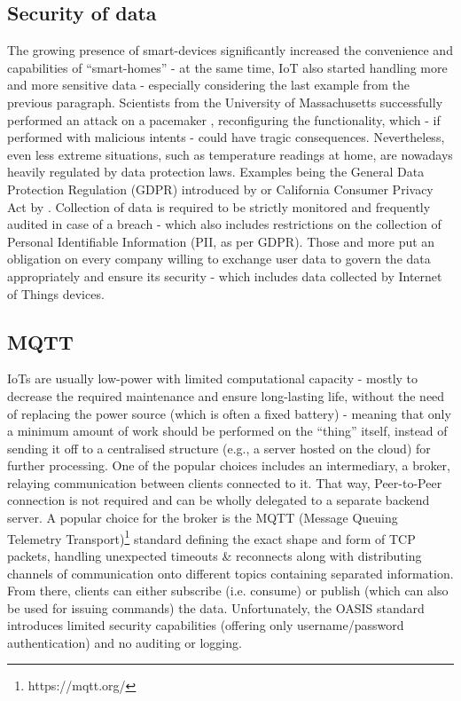 \subsection{Security of data}
The growing presence of smart-devices significantly increased the convenience and capabilities of ``smart-homes'' - at the same time, IoT also started handling more and more sensitive data - especially considering the last example from the previous paragraph. Scientists from the University of Massachusetts successfully performed an attack on a pacemaker \cite{4531149}, reconfiguring the functionality, which - if performed with malicious intents - could have tragic consequences. Nevertheless, even less extreme situations, such as temperature readings at home, are nowadays heavily regulated by data protection laws. Examples being the General Data Protection Regulation (GDPR) introduced by \citet{EUdataregulations2018} or California Consumer Privacy Act by \citet{CCPA}. Collection of data is required to be strictly monitored and frequently audited in case of a breach - which also includes restrictions on the collection of Personal Identifiable Information (PII, as per GDPR). Those and more put an obligation on every company willing to exchange user data to govern the data appropriately and ensure its security - which includes data collected by Internet of Things devices.

\subsection{MQTT}
IoTs are usually low-power with limited computational capacity - mostly to decrease the required maintenance and ensure long-lasting life, without the need of replacing the power source (which is often a fixed battery) - meaning that only a minimum amount of work should be performed on the ``thing'' itself, instead of sending it off to a centralised structure (e.g., a server hosted on the cloud) for further processing. One of the popular choices includes an intermediary, a broker, relaying communication between clients connected to it. That way, Peer-to-Peer connection is not required and can be wholly delegated to a separate backend server. A popular choice for the broker is the MQTT (Message Queuing Telemetry Transport)\footnote{https://mqtt.org/} standard defining the exact shape and form of TCP packets, handling unexpected timeouts \& reconnects along with distributing channels of communication onto different topics containing separated information. From there, clients can either subscribe (i.e. consume) or publish (which can also be used for issuing commands) the data. Unfortunately, the OASIS standard introduces limited security capabilities (offering only username/password authentication) and no auditing or logging.

